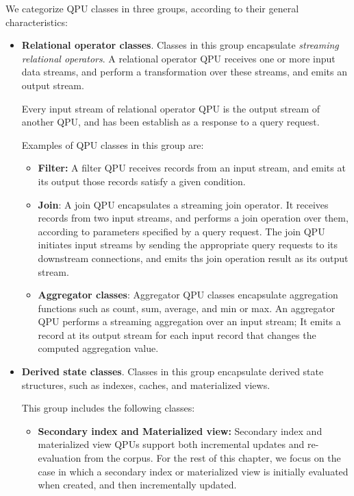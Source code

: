 We categorize QPU classes in three groups, according to their general characteristics:
\begin{itemize}
  \item \textbf{Relational operator classes}.
  Classes in this group encapsulate \textit{streaming relational operators}.
  A relational operator QPU receives one or more input data streams, and perform a transformation over these streams,
  and emits an output stream.

  Every input stream of relational operator QPU is the output stream of another QPU, and has been establish as a response
  to a query request.

  Examples of QPU classes in this group are:
  \begin{itemize}
    \item \textbf{Filter:}
    A filter QPU receives records from an input stream, and  emits at its output those records satisfy a given condition.

    \item \textbf{Join}:
    A join QPU encapsulates a streaming join operator.
    It receives records from two input streams, and performs a join operation over them,
    according to parameters specified by a query request.
    The join QPU initiates input streams by sending the appropriate query requests to its downstream connections,
    and emits ths join operation result as its output stream.

    \item \textbf{Aggregator classes}:
    Aggregator QPU classes encapsulate aggregation functions such as count, sum, average, and min or max.
    An aggregator QPU performs a streaming aggregation over an input stream;
    It emits a record at its output stream for each input record that changes the computed aggregation value.
  \end{itemize}

  \item \textbf{Derived state classes}.
  Classes in this group encapsulate derived state structures, such as indexes, caches, and materialized views.

  This group includes the following classes:
  \begin{itemize}
    \item \textbf{Secondary index and Materialized view:}
    Secondary index and materialized view QPUs support both incremental updates and re-evaluation from the corpus.
    For the rest of this chapter, we focus on the case in which a secondary index or materialized view is initially
    evaluated when created, and then incrementally updated.


\end{itemize}
\end{itemize}
